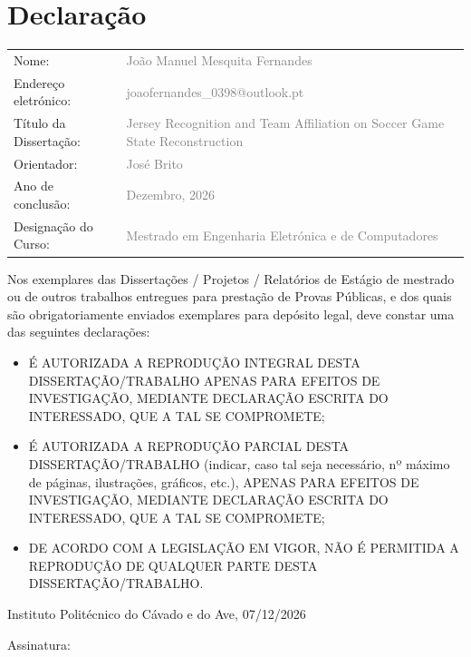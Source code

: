 \chapter*{Declaração}
\pagestyle{empty}

\noindent
\begin{tabular}{@{}ll}
Nome: & \textcolor{gray}{João Manuel Mesquita Fernandes} \\
Endereço eletrónico: & \textcolor{gray}{joaofernandes\_0398@outlook.pt} \\
Título da Dissertação: & \textcolor{gray}{Jersey Recognition and Team Affiliation on Soccer Game State Reconstruction} \\
Orientador: & \textcolor{gray}{José Brito} \\
Ano de conclusão: & \textcolor{gray}{Dezembro, 2026} \\
Designação do Curso: & \textcolor{gray}{Mestrado em Engenharia Eletrónica e de Computadores} \\
\end{tabular}

\vspace{0.8cm}

\noindent
Nos exemplares das Dissertações / Projetos / Relatórios de Estágio de mestrado ou de outros trabalhos entregues para prestação de Provas Públicas, e dos quais são obrigatoriamente enviados exemplares para depósito legal, deve constar uma das seguintes declarações:

\vspace{0.5cm}

\begin{itemize}[leftmargin=1.5cm, labelsep=0.3cm]
    \item[$\Box$] É AUTORIZADA A REPRODUÇÃO INTEGRAL DESTA DISSERTAÇÃO/TRABALHO APENAS PARA EFEITOS DE INVESTIGAÇÃO, MEDIANTE DECLARAÇÃO ESCRITA DO INTERESSADO, QUE A TAL SE COMPROMETE;
    
    \item[$\Box$] É AUTORIZADA A REPRODUÇÃO PARCIAL DESTA DISSERTAÇÃO/TRABALHO (indicar, caso tal seja necessário, nº máximo de páginas, ilustrações, gráficos, etc.), APENAS PARA EFEITOS DE INVESTIGAÇÃO, MEDIANTE DECLARAÇÃO ESCRITA DO INTERESSADO, QUE A TAL SE COMPROMETE;
    
    \item[$\Box$] DE ACORDO COM A LEGISLAÇÃO EM VIGOR, NÃO É PERMITIDA A REPRODUÇÃO DE QUALQUER PARTE DESTA DISSERTAÇÃO/TRABALHO.
\end{itemize}

\vspace{1cm}

\noindent
Instituto Politécnico do Cávado e do Ave, 07/12/2026 

\vspace{1cm}

\noindent
Assinatura: \underline{\hspace{9cm}}